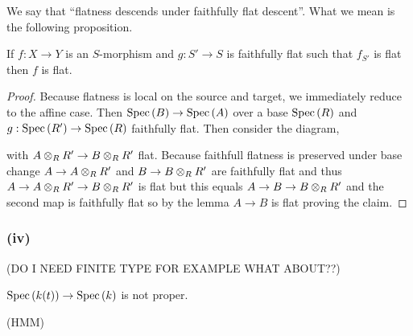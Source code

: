 \documentclass[12pt]{article}
\begin{document}
\begin{rmk}
We say that ``flatness descends under faithfully flat descent''. What we mean is the following proposition.
\end{rmk}

\begin{prop}
If $f : X \to Y$ is an $S$-morphism and $g : S' \to S$ is faithfully flat such that $f_{S'}$ is flat then $f$ is flat.
\end{prop}

\begin{proof}
Because flatness is local on the source and target, we immediately reduce to the affine case. Then $\mathrm{Spec}\left( B \right) \to \mathrm{Spec}\left( A \right)$ over a base $\mathrm{Spec}\left( R \right)$ and $g : \mathrm{Spec}\left( R' \right) \to \mathrm{Spec}\left( R \right)$ faithfully flat. Then consider the diagram,
\begin{center}
\end{center}
with $A \otimes_R R' \to B \otimes_R R'$ flat. Because faithfull flatness is preserved under base change $A \to A \otimes_R R'$ and $B \to B \otimes_R R'$ are faithfully flat and thus $A \to A \otimes_R R' \to B \otimes_R R'$ is flat but this equals $A \to B \to B \otimes_R R'$ and the second map is faithfully flat so by the lemma $A \to B$ is flat proving the claim.
\end{proof}

\subsubsection{(iv)}

(DO I NEED FINITE TYPE FOR EXAMPLE WHAT ABOUT??)

$\mathrm{Spec}\left( k(t) \right) \to \mathrm{Spec}\left( k \right)$ is not proper. 

(HMM)
\end{document}
